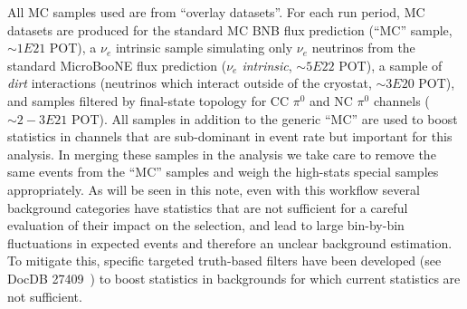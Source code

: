 \documentclass[a4paper]{article}
\begin{document}
\par All MC samples used are from ``overlay datasets''. For each run period, MC datasets are produced for the standard MC BNB flux prediction (``MC'' sample, $\sim1E21$ POT), a $\nu_e$ intrinsic sample simulating only $\nu_e$ neutrinos from the standard MicroBooNE flux prediction (\emph{$\nu_e$ intrinsic}, $\sim5E22$ POT), a sample of \emph{dirt} interactions (neutrinos which interact outside of the cryostat, $\sim3E20$ POT), and samples filtered by final-state topology for CC $\pi^0$ and NC $\pi^0$ channels ($\sim2-3E21$ POT). All samples in addition to the generic ``MC'' are used to boost statistics in channels that are sub-dominant in event rate but important for this analysis. In merging these samples in the analysis we take care to remove the same events from the ``MC'' samples and weigh the high-stats special samples appropriately. As will be seen in this note, even with this workflow several background categories have statistics that are not sufficient for a careful evaluation of their impact on the selection, and lead to large bin-by-bin fluctuations in expected events and therefore an unclear background estimation. To mitigate this, specific targeted truth-based filters have been developed (see DocDB 27409~\cite{bib:truthfilters}) to boost statistics in backgrounds for which current statistics are not sufficient. 
\end{document}
